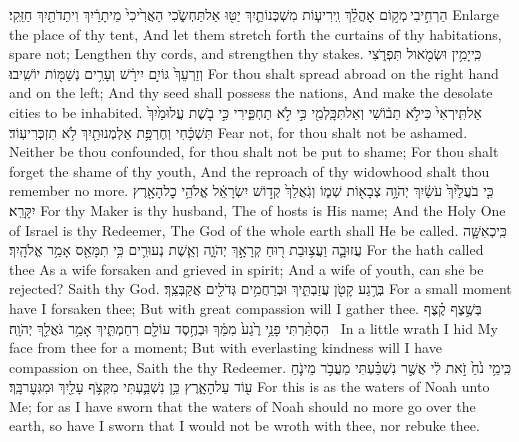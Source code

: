 {הַרְחִ֣יבִי \legarmeh  מְק֣וֹם אׇהֳלֵ֗ךְ וִֽירִיע֧וֹת מִשְׁכְּנוֹתַ֛יִךְ יַטּ֖וּ אַל\maqqaf תַּחְשֹׂ֑כִי הַאֲרִ֙יכִי֙ מֵיתָרַ֔יִךְ וִיתֵדֹתַ֖יִךְ חַזֵּֽקִי׃}
{Enlarge the place of thy tent, And let them stretch forth the curtains of thy habitations, spare not; Lengthen thy cords, and strengthen thy stakes.}
{כִּֽי\maqqaf יָמִ֥ין וּשְׂמֹ֖אול תִּפְרֹ֑צִי וְזַרְעֵךְ֙ גּוֹיִ֣ם יִירָ֔שׁ וְעָרִ֥ים נְשַׁמּ֖וֹת יוֹשִֽׁיבוּ׃}
{For thou shalt spread abroad on the right hand and on the left; And thy seed shall possess the nations, And make the desolate cities to be inhabited.}
{אַל\maqqaf תִּֽירְאִי֙ כִּי\maqqaf לֹ֣א תֵב֔וֹשִׁי וְאַל\maqqaf תִּכָּֽלְמִ֖י כִּ֣י לֹ֣א תַחְפִּ֑ירִי כִּ֣י בֹ֤שֶׁת עֲלוּמַ֙יִךְ֙ תִּשְׁכָּ֔חִי וְחֶרְפַּ֥ת אַלְמְנוּתַ֖יִךְ לֹ֥א תִזְכְּרִי\maqqaf עֽוֹד׃}
{Fear not, for thou shalt not be ashamed. Neither be thou confounded, for thou shalt not be put to shame; For thou shalt forget the shame of thy youth, And the reproach of thy widowhood shalt thou remember no more.}
{כִּ֤י בֹעֲלַ֙יִךְ֙ עֹשַׂ֔יִךְ יְהֹוָ֥ה צְבָא֖וֹת שְׁמ֑וֹ וְגֹֽאֲלֵךְ֙ קְד֣וֹשׁ יִשְׂרָאֵ֔ל אֱלֹהֵ֥י כׇל\maqqaf הָאָ֖רֶץ יִקָּרֵֽא׃}
{For thy Maker is thy husband, The \lord\space of hosts is His name; And the Holy One of Israel is thy Redeemer, The God of the whole earth shall He be called.}
{כִּֽי\maqqaf כְאִשָּׁ֧ה עֲזוּבָ֛ה וַעֲצ֥וּבַת ר֖וּחַ קְרָאָ֣ךְ יְהֹוָ֑ה וְאֵ֧שֶׁת נְעוּרִ֛ים כִּ֥י תִמָּאֵ֖ס אָמַ֥ר אֱלֹהָֽיִךְ׃}
{For the \lord\space hath called thee As a wife forsaken and grieved in spirit; And a wife of youth, can she be rejected? Saith thy God.}
{בְּרֶ֥גַע קָטֹ֖ן עֲזַבְתִּ֑יךְ וּבְרַחֲמִ֥ים גְּדֹלִ֖ים אֲקַבְּצֵֽךְ׃}
{For a small moment have I forsaken thee; But with great compassion will I gather thee.}
{בְּשֶׁ֣צֶף קֶ֗צֶף הִסְתַּ֨רְתִּי פָנַ֥י רֶ֙גַע֙ מִמֵּ֔ךְ וּבְחֶ֥סֶד עוֹלָ֖ם רִחַמְתִּ֑יךְ אָמַ֥ר גֹּאֲלֵ֖ךְ יְהֹוָֽה׃ \setuma }
{In a little wrath I hid My face from thee for a moment; But with everlasting kindness will I have compassion on thee, Saith the \lord\space thy Redeemer.}
{כִּֽי\maqqaf מֵ֥י נֹ֙חַ֙ זֹ֣את לִ֔י אֲשֶׁ֣ר נִשְׁבַּ֗עְתִּי מֵעֲבֹ֥ר מֵי\maqqaf נֹ֛חַ ע֖וֹד עַל\maqqaf הָאָ֑רֶץ כֵּ֥ן נִשְׁבַּ֛עְתִּי מִקְּצֹ֥ף עָלַ֖יִךְ וּמִגְּעׇר\maqqaf בָּֽךְ׃}
{For this is as the waters of Noah unto Me; for as I have sworn that the waters of Noah should no more go over the earth, so have I sworn that I would not be wroth with thee, nor rebuke thee.}

